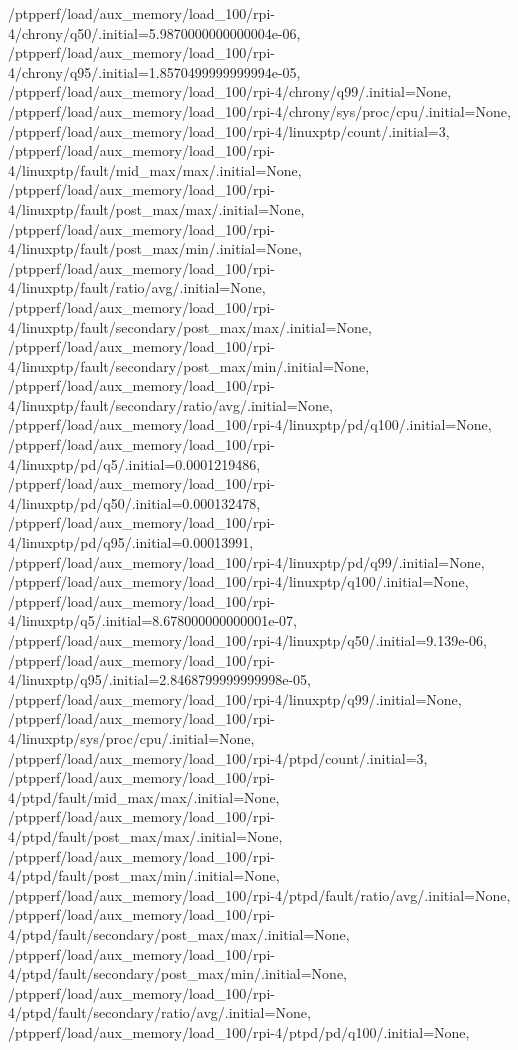 {    /ptpperf/load/aux_memory/load_100/rpi-4/chrony/q50/.initial=5.9870000000000004e-06,
    /ptpperf/load/aux_memory/load_100/rpi-4/chrony/q95/.initial=1.8570499999999994e-05,
    /ptpperf/load/aux_memory/load_100/rpi-4/chrony/q99/.initial=None,
    /ptpperf/load/aux_memory/load_100/rpi-4/chrony/sys/proc/cpu/.initial=None,
    /ptpperf/load/aux_memory/load_100/rpi-4/linuxptp/count/.initial=3,
    /ptpperf/load/aux_memory/load_100/rpi-4/linuxptp/fault/mid_max/max/.initial=None,
    /ptpperf/load/aux_memory/load_100/rpi-4/linuxptp/fault/post_max/max/.initial=None,
    /ptpperf/load/aux_memory/load_100/rpi-4/linuxptp/fault/post_max/min/.initial=None,
    /ptpperf/load/aux_memory/load_100/rpi-4/linuxptp/fault/ratio/avg/.initial=None,
    /ptpperf/load/aux_memory/load_100/rpi-4/linuxptp/fault/secondary/post_max/max/.initial=None,
    /ptpperf/load/aux_memory/load_100/rpi-4/linuxptp/fault/secondary/post_max/min/.initial=None,
    /ptpperf/load/aux_memory/load_100/rpi-4/linuxptp/fault/secondary/ratio/avg/.initial=None,
    /ptpperf/load/aux_memory/load_100/rpi-4/linuxptp/pd/q100/.initial=None,
    /ptpperf/load/aux_memory/load_100/rpi-4/linuxptp/pd/q5/.initial=0.0001219486,
    /ptpperf/load/aux_memory/load_100/rpi-4/linuxptp/pd/q50/.initial=0.000132478,
    /ptpperf/load/aux_memory/load_100/rpi-4/linuxptp/pd/q95/.initial=0.00013991,
    /ptpperf/load/aux_memory/load_100/rpi-4/linuxptp/pd/q99/.initial=None,
    /ptpperf/load/aux_memory/load_100/rpi-4/linuxptp/q100/.initial=None,
    /ptpperf/load/aux_memory/load_100/rpi-4/linuxptp/q5/.initial=8.678000000000001e-07,
    /ptpperf/load/aux_memory/load_100/rpi-4/linuxptp/q50/.initial=9.139e-06,
    /ptpperf/load/aux_memory/load_100/rpi-4/linuxptp/q95/.initial=2.8468799999999998e-05,
    /ptpperf/load/aux_memory/load_100/rpi-4/linuxptp/q99/.initial=None,
    /ptpperf/load/aux_memory/load_100/rpi-4/linuxptp/sys/proc/cpu/.initial=None,
    /ptpperf/load/aux_memory/load_100/rpi-4/ptpd/count/.initial=3,
    /ptpperf/load/aux_memory/load_100/rpi-4/ptpd/fault/mid_max/max/.initial=None,
    /ptpperf/load/aux_memory/load_100/rpi-4/ptpd/fault/post_max/max/.initial=None,
    /ptpperf/load/aux_memory/load_100/rpi-4/ptpd/fault/post_max/min/.initial=None,
    /ptpperf/load/aux_memory/load_100/rpi-4/ptpd/fault/ratio/avg/.initial=None,
    /ptpperf/load/aux_memory/load_100/rpi-4/ptpd/fault/secondary/post_max/max/.initial=None,
    /ptpperf/load/aux_memory/load_100/rpi-4/ptpd/fault/secondary/post_max/min/.initial=None,
    /ptpperf/load/aux_memory/load_100/rpi-4/ptpd/fault/secondary/ratio/avg/.initial=None,
    /ptpperf/load/aux_memory/load_100/rpi-4/ptpd/pd/q100/.initial=None,
}
